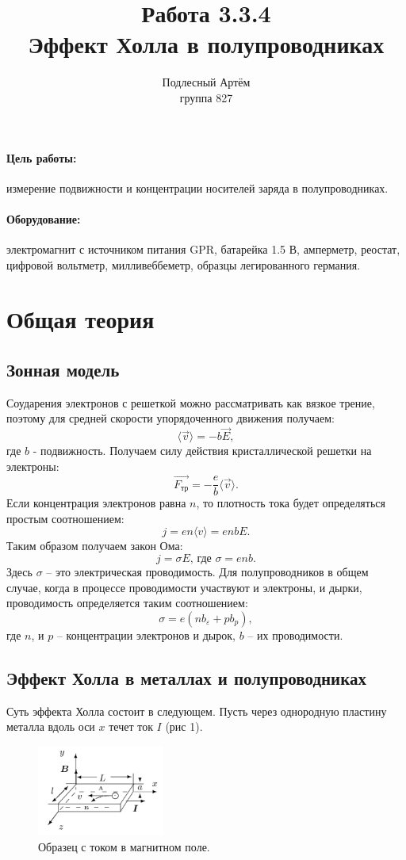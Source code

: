 \documentclass[a4paper, 14pt]{extarticle}%
\author{Подлесный Артём \\ группа 827}
\title{Работа 3.3.4 \\ Эффект Холла в полупроводниках}
\newcommand\ECaption[1]{%
     \captionsetup{font=footnotesize}%
     \caption{#1}}
\begin{document}
\maketitle
\paragraph*{Цель работы:}
измерение подвижности и концентрации носителей заряда в полупроводниках.
\paragraph*{Оборудование:}
электромагнит с источником питания GPR, батарейка 1.5 В, амперметр, реостат, цифровой вольтметр, милливеббеметр, образцы легированного германия.
\section*{Общая теория}
\subsection*{Зонная модель}
Соударения электронов с решеткой можно рассматривать как вязкое трение, поэтому для средней скорости упорядоченного движения получаем:
\[\langle\vec{v}\rangle = -b\vec{E},\]
где $b$ - подвижность. Получаем силу действия кристаллической решетки на электроны:
\[\vec{F_{\text{тр}}} = -\frac{e}{b}\langle\vec{v}\rangle.\]
Если концентрация электронов равна $n$, то плотность тока будет определяться простым соотношением:
\[j = en\langle v\rangle=enbE.\]
Таким образом получаем закон Ома:
\begin{equation}
j = \sigma E \text{, где } \sigma=enb.
\end{equation}
Здесь $\sigma$ -- это электрическая проводимость. Для полупроводников в общем случае, когда в процессе проводимости участвуют и электроны, и дырки, проводимость определяется таким соотношением:
\[\sigma = e(nb_{\varepsilon}+pb_p),\]
где $n$, и $p$ -- концентрации электронов и дырок, $b$ -- их проводимости.
\subsection*{Эффект Холла в металлах и полупроводниках}
Суть эффекта Холла состоит в следующем. Пусть через однородную пластину металла вдоль оси $x$ течет ток $I$ (рис 1).

\begin{figure}
\begin{center}
\includegraphics[height=3cm]{teor.png}
\end{center}
\ECaption{Образец с током в магнитном поле.}
\end{figure}
\end{document}
